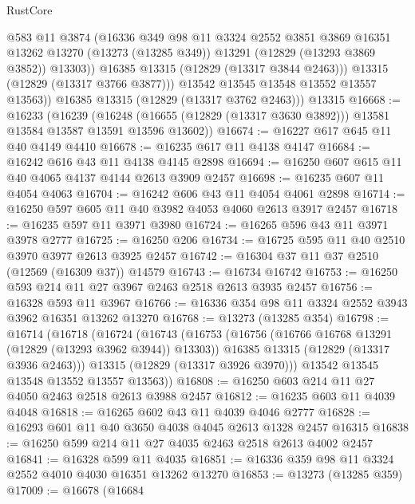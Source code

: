 \begin{lexlean}{RustCore}
\begin{coremodule}
                @583
                @11
                @3874
                (@16336
                  @349
                  @98
                  @11
                  @3324
                  @2552
                  @3851
                  @3869
                  @16351
                  @13262
                  @13270
                  (@13273 (@13285 @349))
                  @13291
                  (@12829 (@13293 @3869 @3852))
                  @13303))
              @16385
              @13315
              (@12829 (@13317 @3844 @2463)))
            @13315
            (@12829 (@13317 @3766 @3877)))
          @13542
          @13545
          @13548
          @13552
          @13557
          @13563))
      @16385
      @13315
      (@12829 (@13317 @3762 @2463)))
    @13315
@16668 := @16233
    (@16239
      (@16248 (@16655 (@12829 (@13317 @3630 @3892))) @13581 @13584 @13587 @13591 @13596 @13602))
@16674 := @16227 @617 @645 @11 @40 @4149 @4410
@16678 := @16235 @617 @11 @4138 @4147
@16684 := @16242 @616 @43 @11 @4138 @4145 @2898
@16694 := @16250 @607 @615 @11 @40 @4065 @4137 @4144 @2613 @3909 @2457
@16698 := @16235 @607 @11 @4054 @4063
@16704 := @16242 @606 @43 @11 @4054 @4061 @2898
@16714 := @16250 @597 @605 @11 @40 @3982 @4053 @4060 @2613 @3917 @2457
@16718 := @16235 @597 @11 @3971 @3980
@16724 := @16265 @596 @43 @11 @3971 @3978 @2777
@16725 := @16250 @206
@16734 := @16725 @595 @11 @40 @2510 @3970 @3977 @2613 @3925 @2457
@16742 := @16304 @37 @11 @37 @2510 (@12569 (@16309 @37)) @14579
@16743 := @16734 @16742
@16753 := @16250 @593 @214 @11 @27 @3967 @2463 @2518 @2613 @3935 @2457
@16756 := @16328 @593 @11 @3967
@16766 := @16336 @354 @98 @11 @3324 @2552 @3943 @3962 @16351 @13262 @13270
@16768 := @13273 (@13285 @354)
@16798 := @16714
    (@16718
      (@16724
        (@16743
          (@16753
            (@16756 (@16766 @16768 @13291 (@12829 (@13293 @3962 @3944)) @13303))
            @16385
            @13315
            (@12829 (@13317 @3936 @2463)))
          @13315
          (@12829 (@13317 @3926 @3970)))
        @13542
        @13545
        @13548
        @13552
        @13557
        @13563))
@16808 := @16250 @603 @214 @11 @27 @4050 @2463 @2518 @2613 @3988 @2457
@16812 := @16235 @603 @11 @4039 @4048
@16818 := @16265 @602 @43 @11 @4039 @4046 @2777
@16828 := @16293 @601 @11 @40 @3650 @4038 @4045 @2613 @1328 @2457 @16315
@16838 := @16250 @599 @214 @11 @27 @4035 @2463 @2518 @2613 @4002 @2457
@16841 := @16328 @599 @11 @4035
@16851 := @16336 @359 @98 @11 @3324 @2552 @4010 @4030 @16351 @13262 @13270
@16853 := @13273 (@13285 @359)
@17009 := @16678
    (@16684

\end{coremodule}
\end{lexlean}

